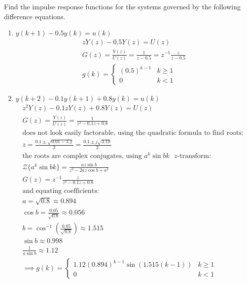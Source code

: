 \documentclass[12pt]{article}
\newenvironment{problem}[2][Problem]{\begin{trivlist}
\item[\hskip \labelsep {\bfseries #1}\hskip \labelsep {\bfseries #2.}]}{\end{trivlist}}
\begin{document}
\pagebreak
\begin{problem}{4}
    Find the impulse response functions for the systems governed by the
    following difference equations.
    \begin{enumerate}[label=\alph*.]
        \item $y(k+1) - 0.5y(k)=u(k)$
        \begin{align*}
            zY(z)-0.5Y(z)=U(z)\\
            G(z) = \frac{Y(z)}{U(z)} = \frac{1}{z-0.5}=z^{-1}\frac{z}{z-0.5}\\
            g(k) = \begin{cases}
                (0.5)^{k-1} & k \geq 1\\
                0 & k<1
            \end{cases}
        \end{align*}
        \item $y(k+2) - 0.1 y(k+1) + 0.8 y(k) = u(k)$
        \begin{align*}
            z^2Y(z)-0.1zY(z) + 0.8Y(z)=U(z)\\
            G(z) = \frac{Y(z)}{U(z)} = \frac{1}{z^2-0.1z+0.8}\\
            \text{does not look easily factorable, using the quadratic formula to find roots: }\\
            z = \frac{0.1\pm\sqrt{0.01-3.2}}{2} = \frac{0.1\pm j\sqrt{3.19}}{2}\\
            \text{the roots are complex conjugates, using $a^k\sin{bk}$ $z$-transform:}\\
            \mathcal{Z}\{a^k\sin{bk}\} = \frac{az\sin{b}}{z^2-2az\cos{b}+a^2}\\
            G(z) = z^{-1}\frac{z}{z^2-0.1z+0.8}\\
            \text{and equating coefficients:}\\
            a=\sqrt{0.8} \approx 0.894\\
            \cos{b} = \frac{0.05}{\sqrt{0.8}} \approx 0.056\\
            b = \cos^{-1}\left({\frac{0.05}{\sqrt{0.8}}}\right) \approx 1.515\\
            \sin{b} \approx 0.998\\
            \frac{1}{a\sin{b}} \approx 1.12\\
            \implies g(k) = \begin{cases}
                1.12(0.894)^{k-1}\sin(1.515(k-1)) & k \geq 1\\
                0 & k < 1
            \end{cases}
        \end{align*}
    \end{enumerate}
\end{problem}
\end{document}
